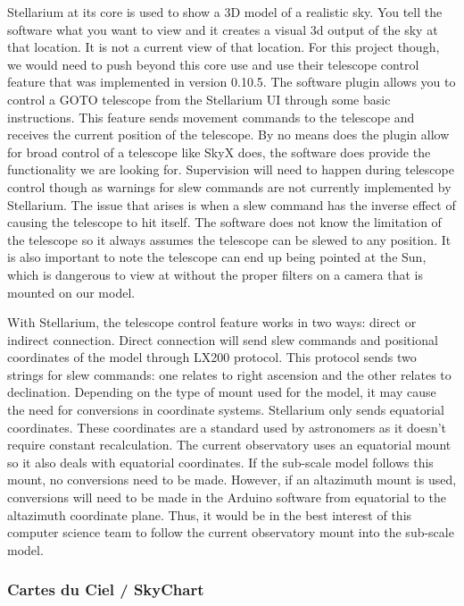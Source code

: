 \documentclass[12pt]{report}
\begin{document}
Stellarium at its core is used to show a 3D model of a realistic sky. You tell the software what you want to view and it creates a visual 3d output of the sky at that location. It is not a current view of that location. For this project though, we would need to push beyond this core use and use their telescope control feature that was implemented in version 0.10.5. The software plugin allows you to control a GOTO telescope from the Stellarium UI through some basic instructions. This feature sends movement commands to the telescope and receives the current position of the telescope. By no means does the plugin allow for broad control of a telescope like SkyX does, the software does provide the functionality we are looking for. Supervision will need to happen during telescope control though as warnings for slew commands are not currently implemented by Stellarium. The issue that arises is when a slew command has the inverse effect of causing the telescope to hit itself. The software does not know the limitation of the telescope so it always assumes the telescope can be slewed to any position. It is also important to note the telescope can end up being pointed at the Sun, which is dangerous to view at without the proper filters on a camera that is mounted on our model.

With Stellarium, the telescope control feature works in two ways: direct or indirect connection. Direct connection will send slew commands and positional coordinates of the model through LX200 protocol. This protocol sends two strings for slew commands: one relates to right ascension and the other relates to declination. Depending on the type of mount used for the model, it may cause the need for conversions in coordinate systems. Stellarium only sends equatorial coordinates. These coordinates are a standard used by astronomers as it doesn't require constant recalculation. The current observatory uses an equatorial mount so it also deals with equatorial coordinates. If the sub-scale model follows this mount, no conversions need to be made. However, if an altazimuth mount is used, conversions will need to be made in the Arduino software from equatorial to the altazimuth coordinate plane. Thus, it would be in the best interest of this computer science team to follow the current observatory mount into the sub-scale model.

\subsubsection*{Cartes du Ciel / SkyChart}
\end{document}
